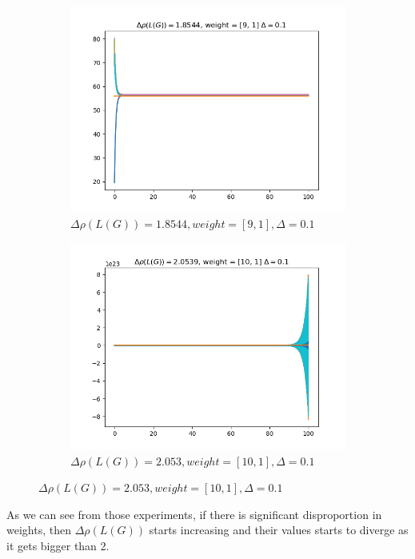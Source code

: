 \documentclass{article}
\begin{document}
\begin{problem}
\begin{figure}[!h]
\begin{subfigure}{0.4\textwidth}
            \includegraphics[width=\textwidth]{./img/Figure_8.png}
            \caption{$\Delta \rho (L(G)) = 1.8544, weight = [9,1], \Delta = 0.1$ }
        \end{subfigure}
        \begin{subfigure}{0.4\textwidth}
            \includegraphics[width=\textwidth]{./img/Figure_9.png}
            \caption{$\Delta \rho (L(G)) = 2.053, weight = [10,1], \Delta = 0.1$ }
        \end{subfigure}
    \end{figure}

    As we can see from those experiments, if there is significant disproportion in weights, then $\Delta \rho (L(G))$ starts increasing and their values starts to diverge as it gets bigger than 2. 
\end{problem}
\end{document}

